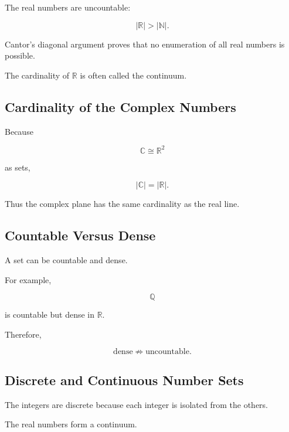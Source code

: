 The real numbers are uncountable:

\[
\boxed{
|\mathbb{R}|
>
|\mathbb{N}|.
}
\]

Cantor's diagonal argument proves that no enumeration of all real numbers is
possible.

The cardinality of \(\mathbb{R}\) is often called the continuum.

\subsection{Cardinality of the Complex Numbers}
\label{subsec:complex-cardinality-reference}

Because

\[
\mathbb{C}
\cong
\mathbb{R}^2
\]

as sets,

\[
\boxed{
|\mathbb{C}|
=
|\mathbb{R}|.
}
\]

Thus the complex plane has the same cardinality as the real line.

\subsection{Countable Versus Dense}
\label{subsec:countable-versus-dense-reference}

A set can be countable and dense.

For example,

\[
\boxed{
\mathbb{Q}
}
\]

is countable but dense in \(\mathbb{R}\).

Therefore,

\[
\boxed{
\text{dense}
\not\Rightarrow
\text{uncountable}.
}
\]

\subsection{Discrete and Continuous Number Sets}
\label{subsec:discrete-continuous-number-sets}

The integers are discrete because each integer is isolated from the others.

The real numbers form a continuum.

